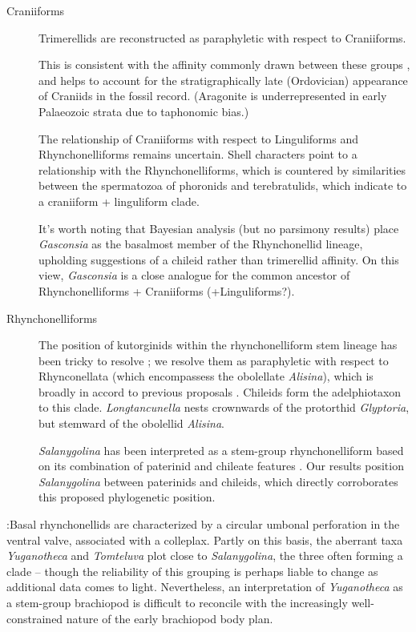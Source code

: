 \documentclass[]{book}
\theoremstyle{definition}
\theoremstyle{definition}
\theoremstyle{definition}
\theoremstyle{remark}
\begin{document}
\begin{description}
\item[Craniiforms]
Trimerellids are reconstructed as paraphyletic with respect to
Craniiforms.

This is consistent with the affinity commonly drawn between these groups
\citep[e.g.][]{Williams2000BrachiopodaLinguliformea}, and helps to
account for the stratigraphically late (Ordovician) appearance of
Craniids in the fossil record. (Aragonite is underrepresented in early
Palaeozoic strata due to taphonomic bias.)

The relationship of Craniiforms with respect to Linguliforms and
Rhynchonelliforms remains uncertain. Shell characters point to a
relationship with the Rhynchonelliforms, which is countered by
similarities between the spermatozoa of phoronids and terebratulids,
which indicate to a craniiform + linguliform clade.

It's worth noting that Bayesian analysis (but no parsimony results)
place \emph{Gasconsia} as the basalmost member of the Rhynchonellid
lineage, upholding suggestions \citep{Holmer2014OrdovicianSilurian} of a
chileid rather than trimerellid affinity. On this view, \emph{Gasconsia}
is a close analogue for the common ancestor of Rhynchonelliforms +
Craniiforms (+Linguliforms?).
\item[Rhynchonelliforms]
The position of kutorginids within the rhynchonelliform stem lineage has
been tricky to resolve \citep{Holmer2018Theattachment}; we resolve them
as paraphyletic with respect to Rhynconellata (which encompassess the
obolellate \emph{Alisina}), which is broadly in accord to previous
proposals \citep{Holmer2018Evolutionarysignificance}. Chileids form the
adelphiotaxon to this clade. \emph{Longtancunella}
\citep{Zhang2011Theexceptionally} nests crownwards of the protorthid
\emph{Glyptoria}, but stemward of the obolellid \emph{Alisina}.

\emph{Salanygolina} has been interpreted as a stem-group
rhynchonelliform based on its combination of paterinid and chileate
features \citep{Holmer2009Theenigmatic}. Our results position
\emph{Salanygolina} between paterinids and chileids, which directly
corroborates this proposed phylogenetic position.
\end{description}

:Basal rhynchonellids are characterized by a circular umbonal
perforation in the ventral valve, associated with a colleplax. Partly on
this basis, the aberrant taxa \emph{Yuganotheca} and \emph{Tomteluva}
plot close to \emph{Salanygolina}, the three often forming a clade --
though the reliability of this grouping is perhaps liable to change as
additional data comes to light. Nevertheless, an interpretation of
\emph{Yuganotheca} as a stem-group brachiopod \citep{Zhang2014Anearly}
is difficult to reconcile with the increasingly well-constrained nature
of the early brachiopod body plan.
\end{document}
